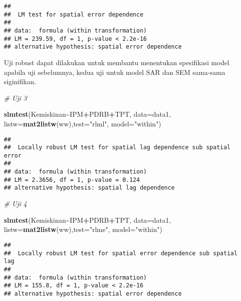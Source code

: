 \documentclass[
]{book}
\newenvironment{Shaded}{\begin{snugshade}}{\end{snugshade}}
\newcommand{\CommentTok}[1]{\textcolor[rgb]{0.56,0.35,0.01}{\textit{#1}}}
\newcommand{\DataTypeTok}[1]{\textcolor[rgb]{0.13,0.29,0.53}{#1}}
\newcommand{\KeywordTok}[1]{\textcolor[rgb]{0.13,0.29,0.53}{\textbf{#1}}}
\newcommand{\NormalTok}[1]{#1}
\newcommand{\OperatorTok}[1]{\textcolor[rgb]{0.81,0.36,0.00}{\textbf{#1}}}
\newcommand{\StringTok}[1]{\textcolor[rgb]{0.31,0.60,0.02}{#1}}
\begin{document}
\begin{verbatim}
## 
##  LM test for spatial error dependence
## 
## data:  formula (within transformation)
## LM = 239.59, df = 1, p-value < 2.2e-16
## alternative hypothesis: spatial error dependence
\end{verbatim}

Uji robust dapat dilakukan untuk membantu menentukan spesifikasi model apabila uji sebelumnya, kedua uji untuk model SAR dan SEM sama-sama siginifikan.

\begin{Shaded}
\begin{Highlighting}[]
\CommentTok{\# Uji 3}

\KeywordTok{slmtest}\NormalTok{(Kemiskinan}\OperatorTok{\textasciitilde{}}\NormalTok{IPM}\OperatorTok{+}\NormalTok{PDRB}\OperatorTok{+}\NormalTok{TPT, }\DataTypeTok{data=}\NormalTok{data1, }\DataTypeTok{listw=}\KeywordTok{mat2listw}\NormalTok{(ww),}\DataTypeTok{test=}\StringTok{"rlml"}\NormalTok{, }\DataTypeTok{model=}\StringTok{"within"}\NormalTok{)}
\end{Highlighting}
\end{Shaded}

\begin{verbatim}
## 
##  Locally robust LM test for spatial lag dependence sub spatial error
## 
## data:  formula (within transformation)
## LM = 2.3656, df = 1, p-value = 0.124
## alternative hypothesis: spatial lag dependence
\end{verbatim}

\begin{Shaded}
\begin{Highlighting}[]
\CommentTok{\# Uji 4}

\KeywordTok{slmtest}\NormalTok{(Kemiskinan}\OperatorTok{\textasciitilde{}}\NormalTok{IPM}\OperatorTok{+}\NormalTok{PDRB}\OperatorTok{+}\NormalTok{TPT, }\DataTypeTok{data=}\NormalTok{data1, }\DataTypeTok{listw=}\KeywordTok{mat2listw}\NormalTok{(ww),}\DataTypeTok{test=}\StringTok{"rlme"}\NormalTok{, }\DataTypeTok{model=}\StringTok{"within"}\NormalTok{)}
\end{Highlighting}
\end{Shaded}

\begin{verbatim}
## 
##  Locally robust LM test for spatial error dependence sub spatial lag
## 
## data:  formula (within transformation)
## LM = 155.8, df = 1, p-value < 2.2e-16
## alternative hypothesis: spatial error dependence
\end{verbatim}
\end{document}
